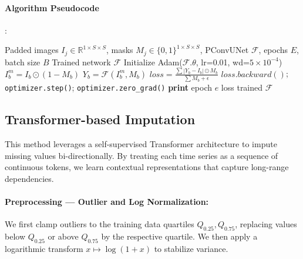 \documentclass[10pt,twocolumn]{article}
\begin{document}
	
	
	\paragraph*{Algorithm Pseudocode}{:}

	\begin{algorithm}[H]
		\caption{Partial Convolution Inpainting}
		\begin{algorithmic}[1]
			\Require Padded images $I_j \in \mathbb{R}^{1\times S\times S}$, masks $M_j \in \{0,1\}^{1\times S\times S}$, PConvUNet $\mathcal{F}$, epochs $E$, batch size $B$
			\Ensure Trained network $\mathcal{F}$
			\State Initialize Adam($\mathcal{F}.\theta$, lr=0.01, wd=$5\times10^{-4}$)
			\State $I_b^m = I_b \odot (1 - M_b)$  
			\State $Y_b = \mathcal{F}(I_b^m, M_b)$  
			\State $loss = \frac{\sum |Y_b - I_b|\odot M_b}{\sum M_b + \epsilon}$  
			\State $loss.backward()$; \texttt{optimizer.step()}; \texttt{optimizer.zero\_grad()}
			\EndFor
			\State \textbf{print} epoch $e$ loss
			\EndFor
			\State \Return trained $\mathcal{F}$
		\end{algorithmic}
	\end{algorithm}
	
	\subsection{Transformer-based Imputation}
	This method leverages a self-supervised Transformer architecture to impute missing values bi-directionally. By treating each time series as a sequence of continuous tokens, we learn contextual representations that capture long-range dependencies.
	
	\paragraph{Preprocessing — Outlier and Log Normalization:}
	We first clamp outliers to the training data quartiles $Q_{0.25}, Q_{0.75}$, replacing values below $Q_{0.25}$ or above $Q_{0.75}$ by the respective quartile. We then apply a logarithmic transform $x\mapsto\log(1+x)$ to stabilize variance.
	
\end{document}
